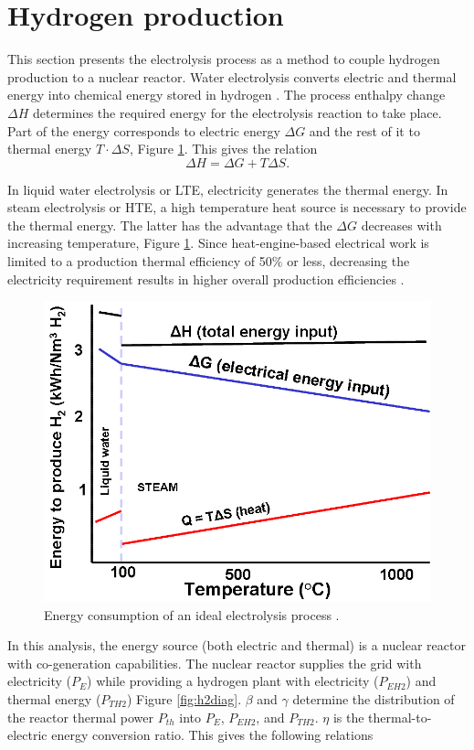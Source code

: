 \documentclass{anstrans}
\begin{document}
\section{Hydrogen production}
\label{section:hydroprod}

This section presents the electrolysis process as a method to couple hydrogen production to a nuclear reactor.
Water electrolysis converts electric and thermal energy into chemical energy stored in hydrogen \cite{hi2h2_highly_2007}.
The process enthalpy change $\Delta H$ determines the required energy for the electrolysis reaction to take place.
Part of the energy corresponds to electric energy $\Delta G$ and the rest of it to thermal energy $T \cdot \Delta S$, Figure \ref{fig:electro}.
This gives the relation
\begin{equation}
\Delta H = \Delta G + T \Delta S.
\end{equation}

In liquid water electrolysis or \gls{LTE}, electricity generates the thermal energy.
In steam electrolysis or \gls{HTE}, a high temperature heat source is necessary to provide the thermal energy.
The latter has the advantage that the $\Delta G$ decreases with increasing temperature, Figure \ref{fig:electro}.
Since heat-engine-based electrical work is limited to a production thermal efficiency of 50$\%$ or less, decreasing the electricity requirement results in higher overall production efficiencies \cite{j_e_obrien_high_2010}.

\begin{figure}[htbp!]
	\centering
	\includegraphics[width=0.7\linewidth]{figures/ele-heat_curve.png}
	\hfill
	\caption{Energy consumption of an ideal electrolysis process \cite{hi2h2_highly_2007}.}
	\label{fig:electro}
\end{figure}

In this analysis, the energy source (both electric and thermal) is a nuclear reactor with co-generation capabilities.
The nuclear reactor supplies the grid with electricity ($P_E$) while providing a hydrogen plant with electricity ($P_{EH2}$) and thermal energy ($P_{TH2}$) Figure \ref{fig:h2diag}.
$\beta$ and $\gamma$ determine the distribution of the reactor thermal power $P_{th}$ into $P_E$, $P_{EH2}$, and $P_{TH2}$.
$\eta$ is the thermal-to-electric energy conversion ratio.
This gives the following relations
\end{document}
